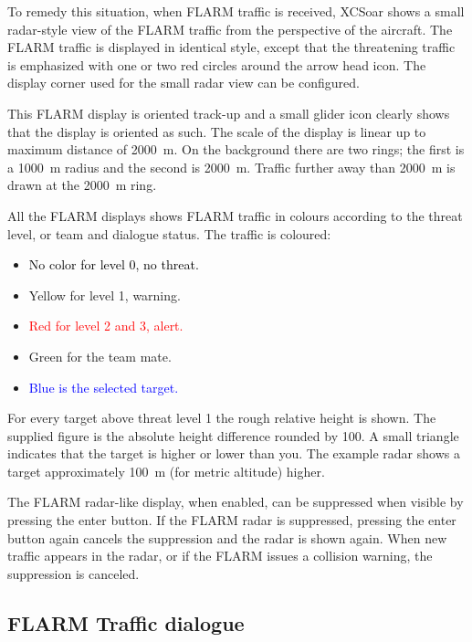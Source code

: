 To remedy this situation, when FLARM traffic is received, XCSoar shows a 
small radar-style view of the FLARM
traffic from the perspective of the aircraft.  The FLARM traffic is
displayed in identical style, except that the threatening traffic is emphasized 
with one or two red circles around the arrow head icon.  The display corner used 
for the small radar view can be configured.

This FLARM display is oriented track-up and a small glider icon
clearly shows that the display is oriented as such.  The scale of the
display is linear up to maximum distance of 2000~m.  On the
background there are two rings; the first is a 1000~m radius and the second
is 2000~m.  Traffic further away than 2000~m is drawn at the 2000~m ring.

All the FLARM displays shows FLARM traffic in colours according to
the threat level, or team and dialogue status.  The traffic is coloured:
\begin{itemize}
\item \textcolor{black} {No color for level 0, no threat.} 
\item \textcolor{warning} { Yellow for level 1, warning.}
\item \textcolor{red} {Red for level 2 and 3, alert.}
\item \textcolor{teammate} {Green for the team mate.}
\item \textcolor{blue} {Blue is the selected target.}
\end{itemize}

For every target above threat level 1 the rough relative height is shown. The
supplied figure is the absolute height difference rounded by 100.  A small
triangle indicates that the target is higher or lower than you.  The example
radar shows a target approximately 100~m (for metric altitude) higher.

The FLARM radar-like display, when enabled, can be suppressed when
visible by pressing the enter button.  If the
FLARM radar is suppressed, pressing the enter button again cancels the
suppression and the radar is shown again.  When new traffic appears in
the radar, or if the FLARM issues a collision warning, the suppression
is canceled.


\subsection*{FLARM Traffic dialogue}\label{sec:flarm-traffic}

